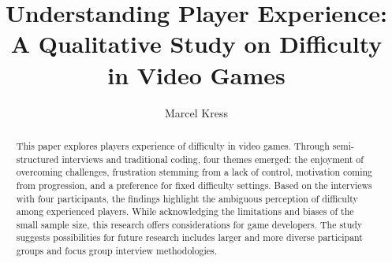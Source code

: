 \documentclass[acmlarge]{acmart}
\begin{document}
\title{Understanding Player Experience: A Qualitative Study on Difficulty in Video Games}
\author{Marcel Kress}
\begin{abstract}
This paper explores players experience of difficulty in video games. Through semi-structured interviews and traditional coding, four themes emerged: the enjoyment of overcoming challenges, frustration stemming from a lack of control, motivation coming from progression, and a preference for fixed difficulty settings. Based on the interviews with four participants, the findings highlight the ambiguous perception of difficulty among experienced players. While acknowledging the limitations and biases of the small sample size, this research offers considerations for game developers. The study suggests possibilities for future research includes larger and more diverse participant groups and focus group interview methodologies.
\end{abstract}

\maketitle





\end{document}
